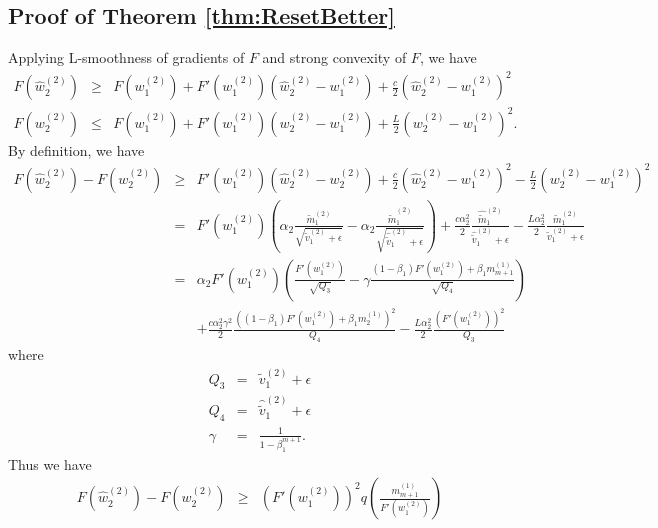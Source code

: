 \documentclass[twoside]{article}
\begin{document}
\subsection{Proof of Theorem \ref{thm:ResetBetter}}
 Applying L-smoothness of gradients of $F$ and strong convexity of $F$, we have
\begin{eqnarray}
F\left(\hat w^{(2)}_2\right) &\geq& F\left(w^{(2)}_1\right) + F'\left(w^{(2)}_1\right)\left(\hat w^{(2)}_2 - w^{(2)}_1\right) + \frac{c}{2}\left(\hat w^{(2)}_2 - w^{(2)}_1\right)^2\nonumber\\
F\left( w^{(2)}_2\right) &\leq& F\left(w^{(2)}_1\right) + F'\left(w^{(2)}_1\right)\left( w^{(2)}_2 - w^{(2)}_1\right) + \frac{L}{2}\left( w^{(2)}_2 - w^{(2)}_1\right)^2.\nonumber
\end{eqnarray}
By definition, we have
\begin{eqnarray}
F\left(\hat w^{(2)}_2\right) - F\left( w^{(2)}_2\right) &\geq& F'\left(w^{(2)}_1\right)\left(\hat w^{(2)}_2 - w^{(2)}_2\right) + \frac{c}{2}\left(\hat w^{(2)}_2 - w^{(2)}_1\right)^2 - \frac{L}{2}\left( w^{(2)}_2 - w^{(2)}_1\right)^2\nonumber\\
&=& F'\left(w^{(2)}_1\right) \left( \alpha_2\frac{\widetilde m^{(2)}_1}{\sqrt{\widetilde v^{(2)}_1 + \epsilon}} - \alpha_2\frac{\hat{\widetilde m}^{(2)}_1}{\sqrt{\hat{\widetilde v}^{(2)}_1 + \epsilon}}\right) + \frac{c\alpha_2^2}{2} \frac{\hat{\widetilde m}^{(2)}_1}{\hat{\widetilde v}^{(2)}_1 + \epsilon} - \frac{L\alpha_2^2}{2} \frac{{\widetilde m}^{(2)}_1}{{\widetilde v}^{(2)}_1 + \epsilon}\nonumber\\
&=& \alpha_2  F'\left(w^{(2)}_1\right) \left( \frac{ F'\left(w^{(2)}_1\right)}{\sqrt{Q_3}} -\gamma \frac{ (1-\beta_1)F'\left(w^{(2)}_1\right) + \beta_1 m^{(1)}_{m+1} }{\sqrt{Q_4}}\right) \nonumber\\
&& + \frac{c\alpha_2^2\gamma^2}{2}\frac{ \left( (1-\beta_1)F'\left(w^{(2)}_1\right) + \beta_1 m^{(1)}_2 \right)^2}{Q_4} - \frac{L\alpha_2^2}{2}  \frac{ \left(F'\left(w^{(2)}_1\right)\right)^2}{Q_3} \nonumber
\end{eqnarray}
where
\begin{eqnarray}
Q_3 &=& \widetilde v^{(2)}_1 + \epsilon \nonumber\\
Q_4 &=& \hat{\widetilde v}^{(2)}_1 + \epsilon \nonumber\\
\gamma &=& \frac{1}{1-\beta_1^{m+1}}.\nonumber
\end{eqnarray}
Thus we have
\begin{eqnarray}
F\left(\hat w^{(2)}_2\right) - F\left( w^{(2)}_2\right)& \geq &  \left(F'\left(w^{(2)}_1\right)\right)^2 q\left( \frac{m^{(1)}_{m+1}}{F'\left(w^{(2)}_{1}\right)}\right)\nonumber
\end{eqnarray}
\end{document}
